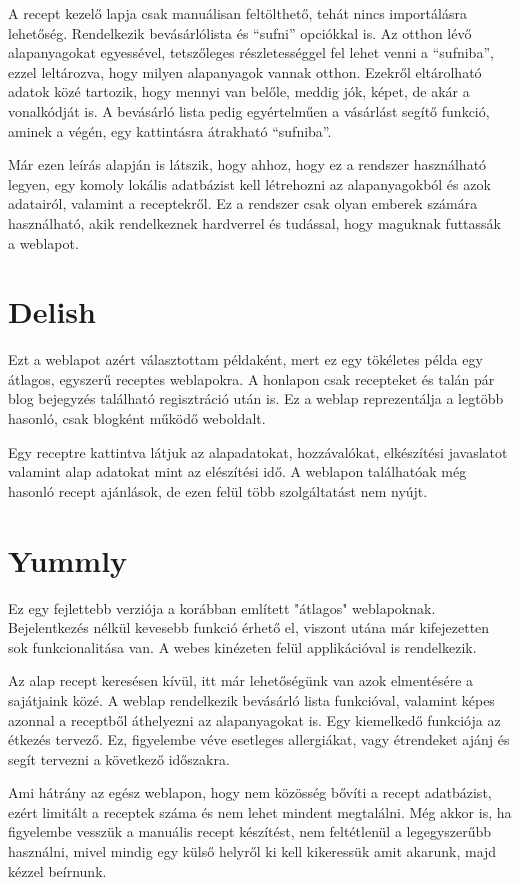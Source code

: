 \documentclass[12pt]{report}
\theoremstyle{definition}
\begin{document}
A recept kezelő lapja csak manuálisan feltölthető, tehát nincs importálásra lehetőség. Rendelkezik bevásárlólista és “sufni” opciókkal is. Az otthon lévő alapanyagokat egyessével, tetszőleges részletességgel fel lehet venni a “sufniba”, ezzel leltározva, hogy milyen alapanyagok vannak otthon. Ezekről eltárolható adatok közé tartozik, hogy mennyi van belőle, meddig jók, képet, de akár a vonalkódját is. A bevásárló lista pedig egyértelműen a vásárlást segítő funkció, aminek a végén, egy kattintásra átrakható “sufniba”. 

Már ezen leírás alapján is látszik, hogy ahhoz, hogy ez a rendszer használható legyen, egy komoly lokális adatbázist kell létrehozni az alapanyagokból és azok adatairól, valamint a receptekről. Ez a rendszer csak olyan emberek számára használható, akik rendelkeznek hardverrel és tudással, hogy maguknak futtassák a weblapot.


\section{Delish}
Ezt a weblapot azért választottam példaként, mert ez egy tökéletes példa egy átlagos, egyszerű receptes weblapokra.  A honlapon csak recepteket és talán pár blog bejegyzés található regisztráció után is. Ez a weblap reprezentálja a legtöbb hasonló, csak blogként működő weboldalt.

Egy receptre kattintva látjuk az alapadatokat, hozzávalókat, elkészítési javaslatot valamint alap adatokat mint az elészítési idő. A weblapon találhatóak még hasonló recept ajánlások, de ezen felül több szolgáltatást nem nyújt.


\section{Yummly}
Ez egy fejlettebb verziója a korábban említett "átlagos" weblapoknak. Bejelentkezés nélkül kevesebb funkció érhető el, viszont utána már kifejezetten sok funkcionalitása van. A webes kinézeten felül applikációval is rendelkezik. 

Az alap recept keresésen kívül, itt már lehetőségünk van azok elmentésére a sajátjaink közé. A weblap rendelkezik bevásárló lista funkcióval, valamint képes azonnal a receptből áthelyezni az alapanyagokat is. Egy kiemelkedő funkciója az étkezés tervező. Ez, figyelembe véve esetleges allergiákat, vagy étrendeket ajánj és segít tervezni a következő időszakra. 

Ami hátrány az egész weblapon, hogy nem közösség bővíti a recept adatbázist, ezért limitált a receptek száma és nem lehet mindent megtalálni. Még akkor is, ha figyelembe vesszük a manuális recept készítést, nem feltétlenül a legegyszerűbb használni, mivel mindig egy külső helyről ki kell kikeressük amit akarunk, majd kézzel beírnunk.
\end{document}
